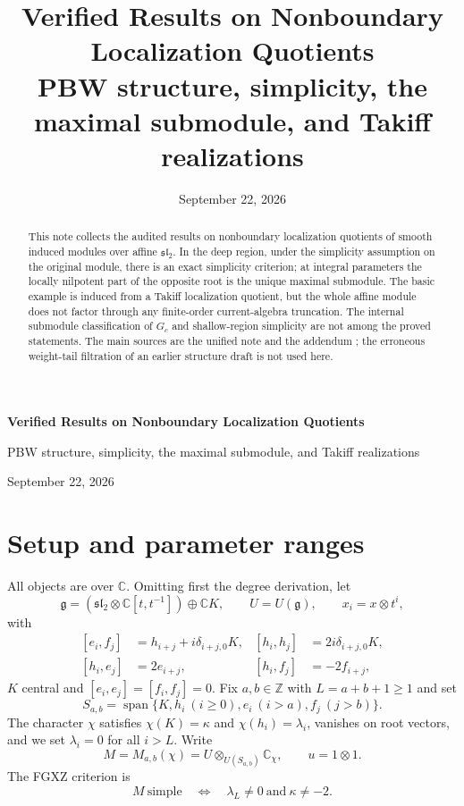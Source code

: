 \documentclass[11pt,a4paper]{article}
\title{\vspace{-10mm}Verified Results on Nonboundary Localization Quotients\\[2pt]
\normalsize PBW structure, simplicity, the maximal submodule, and Takiff realizations}
\author{}
\date{September 22, 2026}
\theoremstyle{upright}
\newcommand{\C}{\mathbb C}
\newcommand{\Z}{\mathbb Z}
\newcommand{\g}{\mathfrak g}
\newcommand{\slc}{\mathfrak{sl}_2}
\DeclareMathOperator{\Span}{span}
\begin{document}
\thispagestyle{plain}
\begin{center}
{\Large\bfseries Verified Results on Nonboundary Localization Quotients}\par\vspace{3pt}
{\normalsize PBW structure, simplicity, the maximal submodule, and Takiff realizations}\par\vspace{5pt}
{\small September 22, 2026}
\end{center}
\vspace{-3mm}
\begin{abstract}
This note collects the audited results on nonboundary localization quotients
of smooth induced modules over affine $\slc$. In the deep region, under the
simplicity assumption on the original module, there is an exact simplicity
criterion; at integral parameters the locally nilpotent part of the opposite
root is the unique maximal submodule. The basic example is induced from a
Takiff localization quotient, but the whole affine module does not factor
through any finite-order current-algebra truncation. The internal submodule
classification of $G_c$ and shallow-region simplicity are not among the
proved statements. The main sources are the unified note and the addendum
\cite{Unified,Addendum}; the erroneous weight-tail filtration of an earlier
structure draft is not used here.
\end{abstract}

\section{Setup and parameter ranges}

All objects are over $\C$. Omitting first the degree derivation, let
\[
\g=(\slc\otimes\C[t,t^{-1}])\oplus\C K,\qquad U=U(\g),\qquad x_i=x\otimes t^i,
\]
with
\[
\begin{aligned}
[e_i,f_j]&=h_{i+j}+i\delta_{i+j,0}K,& [h_i,h_j]&=2i\delta_{i+j,0}K,\\
[h_i,e_j]&=2e_{i+j},&[h_i,f_j]&=-2f_{i+j},
\end{aligned}
\]
$K$ central and $[e_i,e_j]=[f_i,f_j]=0$. Fix $a,b\in\Z$ with $L=a+b+1\ge1$
and set
\[
S_{a,b}=\Span\{K,h_i\ (i\ge0),e_i\ (i>a),f_j\ (j>b)\}.
\]
The character $\chi$ satisfies $\chi(K)=\kappa$ and $\chi(h_i)=\lambda_i$,
vanishes on root vectors, and we set $\lambda_i=0$ for all $i>L$. Write
\[
M=M_{a,b}(\chi)=U\otimes_{U(S_{a,b})}\C_\chi,\qquad u=1\otimes1.
\]
The FGXZ criterion is \cite[Theorem 1.1]{FGXZ}
\begin{equation}\label{eq:original-simple}
M\ \text{simple}\quad\Longleftrightarrow\quad \lambda_L\ne0\ \text{and}\ \kappa\ne-2.
\end{equation}
\end{document}
